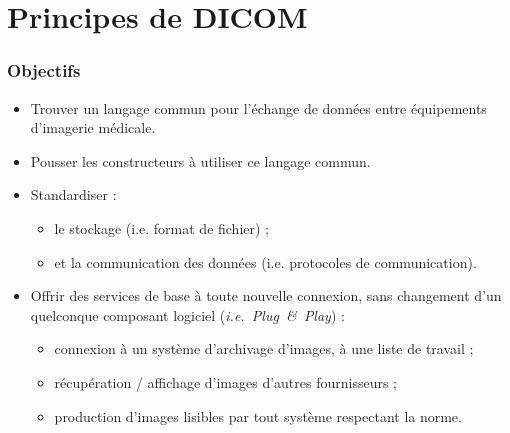 \section{Principes de DICOM}

	\frame
	{
		\frametitle{Objectifs}
		\begin{itemize}
			\item Trouver un langage commun pour l'\'echange de donn\'ees entre \'equipements d'imagerie m\'edicale.
			\item<2-> Pousser les constructeurs \`a utiliser ce langage commun.
			\item<3-> Standardiser :
			\begin{itemize}
				\item<4-> le stockage (i.e. format de fichier) ;
				\item<5-> et la communication des donn\'ees (i.e. protocoles de communication).
			\end{itemize}
			\item<6-> Offrir des services de base \`a toute nouvelle connexion, sans changement d'un quelconque composant logiciel (\emph{i.e.~Plug~\&~Play}) :
    			\begin{itemize}
        				\item<7-> connexion \`a un syst\`eme d'archivage d'images, \`a une liste de travail ;
        				\item<8-> r\'ecup\'eration / affichage d'images d'autres fournisseurs ;
        				\item<9-> production d'images lisibles par tout syst\`eme respectant la norme.
        			\end{itemize}

		\end{itemize}
	}
	
